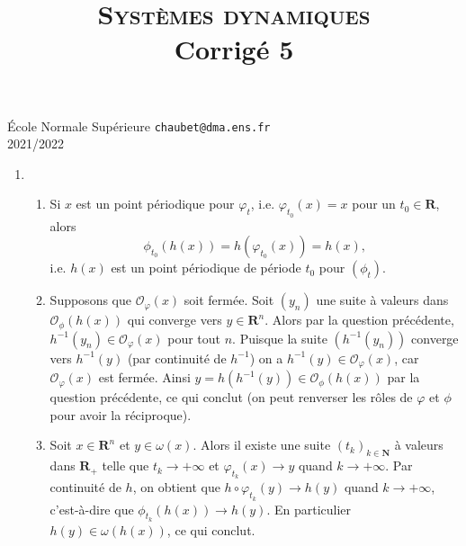 \documentclass[a4paper,12pt,openany]{article}
\title{\textsc{Syst\`emes dynamiques} \\ Corrig\'e 5}
\date{}
\author{}
\theoremstyle{plain}
\theoremstyle{definition}
\newcommand{\R}{\mathbf{R}}
\newcommand{\N}{\mathbf{N}}
\begin{document}
{\noindent \'Ecole Normale Sup\'erieure  \hfill \texttt{chaubet@dma.ens.fr} } \\
{2021/2022 \hfill}

{\let\newpage\relax\maketitle}
\maketitle



\begin{enumerate}
\item 
\begin{enumerate}
\item Si $x$ est un point p\'eriodique pour $\varphi_t$, i.e. $\varphi_{t_0}(x) = x$ pour un $t_0 \in \R$, alors 
$$
\phi_{t_0}(h(x)) = h (\varphi_{t_0}(x)) = h(x),
$$
i.e. $h(x)$ est un point p\'eriodique de p\'eriode $t_0$ pour $(\phi_t)$.
\item Supposons que $\mathcal{O}_\varphi(x)$ soit ferm\'ee. Soit $(y_n)$ une suite \`a valeurs dans $\mathcal{O}_\phi(h(x))$ qui converge vers $y \in \R^n$. Alors par la question pr\'ec\'edente, $h^{-1}(y_n) \in \mathcal{O}_\varphi(x)$ pour tout $n$. Puisque la suite $(h^{-1}(y_n))$ converge vers $h^{-1}(y)$ (par continuit\'e de $h^{-1}$) on a $h^{-1}(y) \in \mathcal{O}_\varphi(x)$, car $\mathcal{O}_\varphi(x)$ est ferm\'ee. Ainsi $y = h(h^{-1}(y)) \in \mathcal{O}_\phi(h(x))$ par la question pr\'ec\'edente, ce qui conclut (on peut renverser les r\^oles de $\varphi$ et $\phi$ pour avoir la r\'eciproque).

\item Soit $x \in \R^n$ et $y \in \omega(x)$. Alors il existe une suite $(t_k)_{k \in \N}$ \`a valeurs dans $\R_+$ telle que $t_k \to +\infty$ et $\varphi_{t_k}(x) \to y$ quand $k \to +\infty$. Par continuit\'e de $h$, on obtient que $h\circ \varphi_{t_k}(y) \to h(y)$ quand $k \to +\infty$, c'est-\`a-dire que $\phi_{t_k}(h(x)) \to h(y).$ En particulier $h(y) \in \omega(h(x))$, ce qui conclut.


\end{enumerate}
\end{enumerate}
\end{document}
